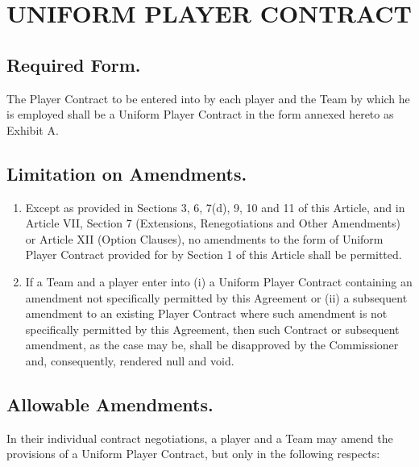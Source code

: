 \documentclass[
]{book}
\providecommand{\tightlist}{%
  \setlength{\itemsep}{0pt}\setlength{\parskip}{0pt}}
\begin{document}
\hypertarget{uniform-player-contract}{%
\chapter{UNIFORM PLAYER CONTRACT}\label{uniform-player-contract}}

\hypertarget{required-form.}{%
\section{Required Form.}\label{required-form.}}

The Player Contract to be entered into by each player and the Team by which he is employed shall be a Uniform Player Contract in the form annexed hereto as Exhibit A.

\hypertarget{limitation-on-amendments.}{%
\section{Limitation on Amendments.}\label{limitation-on-amendments.}}

\begin{enumerate}
\def\labelenumi{(\alph{enumi})}
\tightlist
\item
  Except as provided in Sections 3, 6, 7(d), 9, 10 and 11 of this Article, and in Article VII, Section 7 (Extensions, Renegotiations and Other Amendments) or Article XII (Option Clauses), no amendments to the form of Uniform Player Contract provided for by Section 1 of this Article shall be permitted.
\item
  If a Team and a player enter into (i) a Uniform Player Contract containing an amendment not specifically permitted by this Agreement or (ii) a subsequent amendment to an existing Player Contract where such amendment is not specifically permitted by this Agreement, then such Contract or subsequent amendment, as the case may be, shall be disapproved by the Commissioner and, consequently, rendered null and void.
\end{enumerate}

\hypertarget{allowable-amendments.}{%
\section{Allowable Amendments.}\label{allowable-amendments.}}

In their individual contract negotiations, a player and a Team may amend the provisions of a Uniform Player Contract, but only in the following respects:
\end{document}
